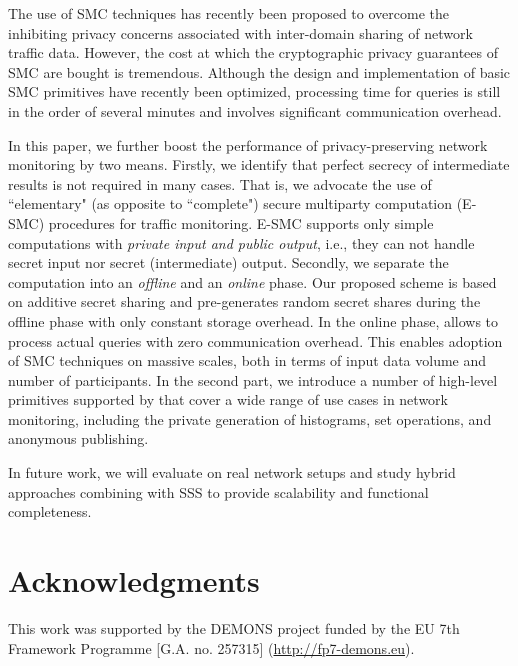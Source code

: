 \documentclass{sig-alternate}
\begin{document}
The use of SMC techniques has recently been proposed to overcome the inhibiting privacy concerns associated with inter-domain sharing of network traffic data. 
However, the cost at which the cryptographic privacy guarantees of SMC are bought is tremendous.
Although the design and implementation of basic SMC primitives have recently been optimized, processing time for queries is still in the order of several minutes and involves significant communication overhead.

In this paper, we further boost the performance of privacy-preserving network monitoring by two means. Firstly, we identify that perfect secrecy of intermediate results is not required in many cases.
That is, we advocate the use of ``elementary" (as opposite to ``complete") secure multiparty computation (E-SMC) procedures for traffic monitoring. E-SMC supports only simple computations with {\em private input and public output}, i.e., they can not handle secret input nor secret (intermediate) output. 
Secondly, we separate the computation into an \emph{offline} and an \emph{online} phase. 
Our proposed scheme \ata is based on additive secret sharing and pre-generates  random secret shares during the offline phase with only constant storage overhead. In the online phase, \ata allows to process actual queries with zero communication overhead. This enables adoption of SMC techniques on massive scales, both in terms of input data volume and number of participants. In the second part, we introduce a number of high-level primitives supported by \ata that cover a wide range of use cases in network monitoring, including the private generation of histograms, set operations, and anonymous publishing. 

In future work, we will evaluate \ata on real network setups and study hybrid approaches combining \ata with SSS to provide scalability and functional completeness. \\


\section*{Acknowledgments} 
This work was supported by the DEMONS project funded by  the EU 7th Framework Programme [G.A. no. 257315] (\url{http://fp7-demons.eu}).




\end{document}
